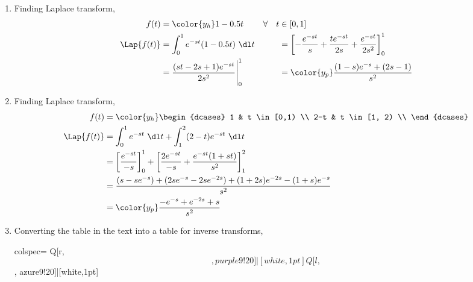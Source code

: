 \begin{enumerate}
      \item Finding Laplace transform,
            \begin{align}
                  f(t)             & = \color{y_h} 1 - 0.5t                         &
                  \forall \quad  t & \in [0,1]                                        \\
                  \Lap\{f(t)\}     & =  \int_{0}^{1} e^{-st}(1-0.5t)\ \dl t         &
                                   & = \left[ -\frac{e^{-st}}{s} +
                  \frac{te^{-st}}{2s} + \frac{e^{-st}}{2s^2} \right]_0^1              \\
                                   & = \frac{(st - 2s + 1)e^{-st}}{2s^2} \Bigg|_0^1 &
                                   & = \color{y_p}\frac{(1-s)e^{-s} + (2s-1)}{s^2}
            \end{align}
      \item Finding Laplace transform,
            \begin{align}
                  f(t)         & = \color{y_h}
                  \begin{dcases}
                        1   & t \in [0,1)  \\
                        2-t & t \in [1, 2) \\
                  \end{dcases}                                                   \\
                  \Lap\{f(t)\} & =  \int_{0}^{1} e^{-st}\ \dl t
                  +  \int_{1}^{2}(2-t) e^{-st}\ \dl t                                  \\
                               & = \left[ \frac{e^{-st}}{-s} \right]_0^1
                  + \left[ \frac{2e^{-st}}{-s} + \frac{e^{-st}(1+st)}{s^2} \right]_1^2 \\
                               & = \frac{(s - se^{-s}) + (2se^{-s} - 2se^{-2s})
                  + (1+2s)e^{-2s} - (1+s)e^{-s}}{s^2}                                  \\
                               & = \color{y_p}\frac{-e^{-s} + e^{-2s} + s}{s^2}
            \end{align}
      \item Converting the table in the text into a table for inverse transforms,
            \begin{table}[H]
                  \centering
                  \begin{tblr}{
                        colspec={
                        Q[r, $$, purple9!20]|[white,1pt]Q[l, $$, azure9!20]|[white,1pt]
}}
\end{tblr}
\end{table}
\end{enumerate}
